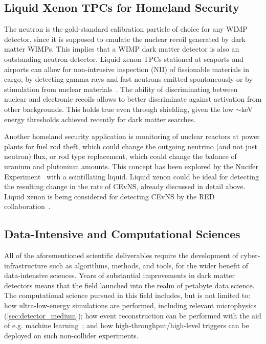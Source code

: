 \subsection{Liquid Xenon TPCs for Homeland Security}

The neutron is the gold-standard calibration particle of choice for any WIMP detector, since it is supposed to emulate the nuclear recoil generated by dark matter WIMPs. This implies that a WIMP dark matter detector is also an outstanding neutron detector. Liquid xenon TPCs stationed at seaports and airports can allow for non-intrusive inspection (NII) of fissionable materials in cargo, by detecting gamma rays and fast neutrons emitted spontaneously or by stimulation from nuclear materials~\cite{Nikkel:2012zz}. The ability of discriminating between nuclear and electronic recoils allows to better discriminate against activation from other backgrounds. This holds true even through shielding, given the low $\sim$keV energy thresholds achieved recently for dark matter searches. 

Another homeland security application is monitoring of nuclear reactors at power plants for fuel rod theft, which could change the outgoing neutrino (and not just neutron) flux, or rod type replacement, which could change the balance of uranium and plutonium amounts. This concept has been explored by the Nucifer Experiment~\cite{Boireau:2015dda} with a scintillating liquid. Liquid xenon could be ideal for detecting the resulting change in the rate of CEvNS, already discussed in detail above. Liquid xenon is being considered for detecting CEvNS by the RED collaboration~\cite{Akimov:2019ogx}.

\subsection{Data-Intensive and Computational Sciences}

All of the aforementioned scientific deliverables require the development of cyber-infrastructure such as algorithms, methods, and tools, for the wider benefit of data-intensive sciences. Years of substantial improvements in dark matter detectors means that the field launched into the realm of petabyte data science. The computational science pursued in this field includes, but is not limited to: how ultra-low-energy simulations are performed, including relevant microphysics (\autoref{sec:detector_medium}); how event reconstruction can be performed with the aid of e.g. machine learning~\cite{Khosa:2019qgp}; and how high-throughput/high-level triggers can be deployed on such non-collider experiments.  

